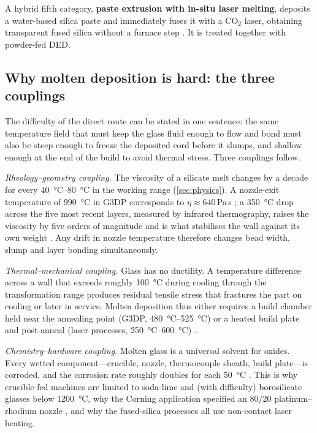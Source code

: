 A hybrid fifth category, \textbf{paste extrusion with in-situ laser melting}, deposits a water-based silica paste and immediately fuses it with a CO$_2$ laser, obtaining transparent fused silica without a furnace step \citep{ieee2019dlm,paste2024}. It is treated together with powder-fed DED.

\subsection{Why molten deposition is hard: the three couplings}
The difficulty of the direct route can be stated in one sentence: the same temperature field that must keep the glass fluid enough to flow and bond must also be steep enough to freeze the deposited cord before it slumps, and shallow enough at the end of the build to avoid thermal stress. Three couplings follow.

\emph{Rheology--geometry coupling.} The viscosity of a silicate melt changes by a decade for every \SIrange{40}{80}{\celsius} in the working range (\cref{sec:physics}). A nozzle-exit temperature of \SI{990}{\celsius} in G3DP corresponds to \(\eta \approx 640\,\)Pa\,s \citep{klein2015}; a \SI{350}{\celsius} drop across the five most recent layers, measured by infrared thermography, raises the viscosity by five orders of magnitude and is what stabilises the wall against its own weight \citep{klein2015}. Any drift in nozzle temperature therefore changes bead width, slump and layer bonding simultaneously.

\emph{Thermal--mechanical coupling.} Glass has no ductility. A temperature difference across a wall that exceeds roughly \SI{100}{\celsius} during cooling through the transformation range produces residual tensile stress that fractures the part on cooling or later in service. Molten deposition thus either requires a build chamber held near the annealing point (G3DP, \SIrange{480}{525}{\celsius}) or a heated build plate and post-anneal (laser processes, \SIrange{250}{600}{\celsius}) \citep{klein2015,inamura2018,luo2017sodalime,datsiou2019}.

\emph{Chemistry--hardware coupling.} Molten glass is a universal solvent for oxides. Every wetted component---crucible, nozzle, thermocouple sheath, build plate---is corroded, and the corrosion rate roughly doubles for each \SI{50}{\celsius} \citep{zircorr2025,pgm2010}. This is why crucible-fed machines are limited to soda-lime and (with difficulty) borosilicate glasses below \SI{1200}{\celsius}, why the Corning application specified an 80/20 platinum--rhodium nozzle \citep{patent_corning2021}, and why the fused-silica processes all use non-contact laser heating.

